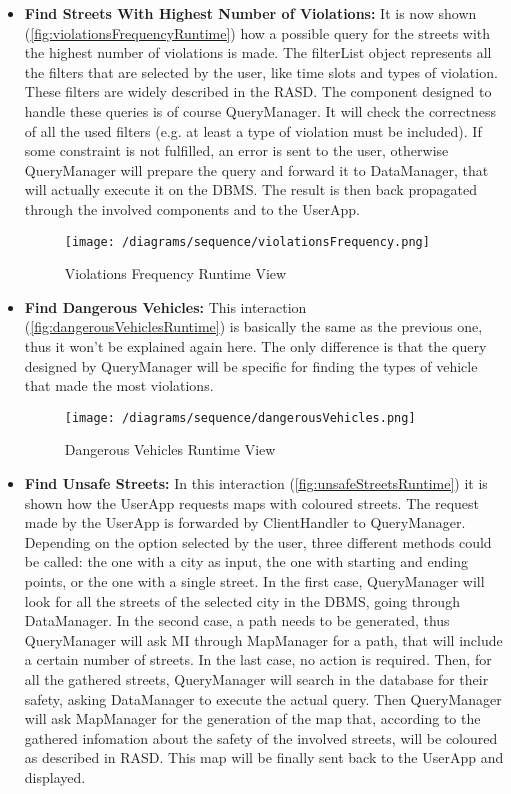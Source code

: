 			\begin{itemize}
				\item \textbf{Find Streets With Highest Number of Violations:} It is now shown (\autoref{fig:violationsFrequencyRuntime}) how a possible query for the streets with the highest number of violations is made. The filterList object represents all the filters that are selected by the user, like time slots and types of violation. These filters are widely described in the RASD. The component designed to handle these queries is of course QueryManager. It will check the correctness of all the used filters (e.g. at least a type of violation must be included). If some constraint is not fulfilled, an error is sent to the user, otherwise QueryManager will prepare the query and forward it to DataManager, that will actually execute it on the DBMS. The result is then back propagated through the involved components and to the UserApp.
				
				\begin{figure}[h!]
					\centering
					\texttt{[image: /diagrams/sequence/violationsFrequency.png]}
					\caption{\label{fig:violationsFrequencyRuntime} Violations Frequency Runtime View}
				\end{figure}
			
				\item \textbf{Find Dangerous Vehicles:} This interaction (\autoref{fig:dangerousVehiclesRuntime}) is basically the same as the previous one, thus it won't be explained again here. The only difference is that the query designed by QueryManager will be specific for finding the types of vehicle that made the most violations.
				
				\begin{figure}[h!]
					\centering
					\texttt{[image: /diagrams/sequence/dangerousVehicles.png]}
					\caption{\label{fig:dangerousVehiclesRuntime} Dangerous Vehicles Runtime View}
				\end{figure}
			
				\item \textbf{Find Unsafe Streets:} In this interaction (\autoref{fig:unsafeStreetsRuntime}) it is shown how the UserApp requests maps with coloured streets. The request made by the UserApp is forwarded by ClientHandler to QueryManager. Depending on the option selected by the user, three different methods could be called: the one with a city as input, the one with starting and ending points, or the one with a single street. In the first case, QueryManager will look for all the streets of the selected city in the DBMS, going through DataManager. In the second case, a path needs to be generated, thus QueryManager will ask MI through MapManager for a path, that will include a certain number of streets. In the last case, no action is required. Then, for all the gathered streets, QueryManager will search in the database for their safety, asking DataManager to execute the actual query. Then QueryManager will ask MapManager for the generation of the map that, according to the gathered infomation about the safety of the involved streets, will be coloured as described in RASD. This map will be finally sent back to the UserApp and displayed.		
		

\end{itemize}
